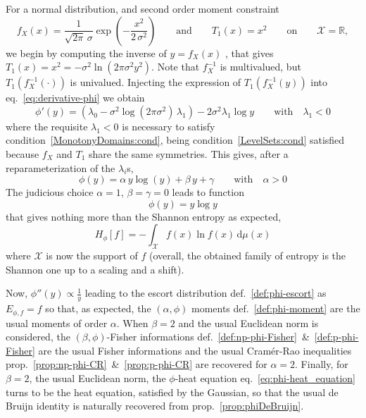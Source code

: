 \documentclass[entropy,article,submit,moreauthors,pdftex]{Definitions/mdpi}
\newcommand{\SZ}[1]{{\color{blue} #1}}                                       %
\def\dmu{\mathrm{d}\mu}%
\def\Rset{\mathbb{R}}%
\def\X{\mathcal{X}}%
\begin{document}
For a normal distribution, and second order moment constraint 
%
\[
f_X(x) =  \frac{1}{\sqrt{2\pi} \,\sigma}  \exp\left( -\frac{x^2}{2  \, \sigma^2}
\right)  \qquad \mbox{and}  \qquad T_1(x)  = x^2  \qquad \mbox{on}  \qquad \X  =
\Rset,
\]
%
we begin by computing the inverse of  $y = f_X(x)$\SZ{, that gives $T_1(x) = x^2
  = -  \sigma^2 \ln \left(2 \pi  \sigma^2 y^2 \right)$. Note  that $f_X^{-1}$ is
  multivalued,  but   $T_1\left(  f_X^{-1}(  \cdot  )   \right)$  is  univalued.
  Injecting   the   expression   of   $T_1\left(   f_X^{-1}(y)   \right)$   into
  eq.~\eqref{eq:derivative-phi} we obtain}
%
\[
\phi'(y) = \left( \lambda_0 - \sigma^2 \log(2 \pi \sigma^2) \, \lambda_1 \right)
- 2 \sigma^2 \lambda_1 \log y \qquad \mbox{with} \quad \lambda_1 < 0
\]
%
\SZ{where   the    requisite   $\lambda_1    <0$   is   necessary    to   satisfy
  condition~\ref{MonotonyDomains:cond},   being   condition~\ref{LevelSets:cond}
  satisfied because $f_X$ and $T_1$ share the same symmetries. This gives, after
  a reparameterization of the $\lambda_i$s,
  \[
  \phi(y)  = \alpha \,  y \log(y)  + \beta \,  y +  \gamma \qquad
  \mbox{with} \quad \alpha > 0
  \]
%
The judicious choice $\alpha = 1, \, \beta = \gamma = 0$} leads to function
%
\[
\phi(y) = y \log y
\]
%
that gives nothing  more than the Shannon entropy as expected,
%
\SZ{
  \[
  H_\phi[f] = - \int_\X f(x) \ln f(x) \, \dmu(x) 
  \]
  where $\X$ is now the support of  $f$ (overall, the obtained family of entropy
  is the Shannon one up to a scaling and a shift).}

Now,   $\phi''(y)  \propto   \frac1y$   leading  to   the  escort   distribution
\SZ{def.~\ref{def:phi-escort} as}  $E_{\phi,f} =  f$ so  that, as  expected, the
$(\alpha,\phi)$ moments \SZ{def.~\ref{def:phi-moment}} are  the usual moments of
order $\alpha$.   When $\beta = 2$  and the usual Euclidean  norm is considered,
the                      $(\beta,\phi)$-Fisher                      informations
\SZ{def.~\ref{def:np-phi-Fisher}~\&~\ref{def:p-phi-Fisher}} are the usual Fisher
informations       and      the       usual      Cram\'er-Rao       inequalities
\SZ{prop.~\ref{prop:np-phi-CR}~\&~\ref{prop:p-phi-CR}} are recovered for $\alpha
=  2$.  Finally,  for $\beta  = 2$,  the usual  Euclidean norm,  the $\phi$-heat
equation \SZ{eq.~\eqref{eq:phi-heat_equation}}  turns to  be the  heat equation,
satisfied by  the Gaussian, so  that the usual  de Bruijn identity  is naturally
recovered \SZ{from prop.~\ref{prop:phiDeBruijn}}.
\end{document}
